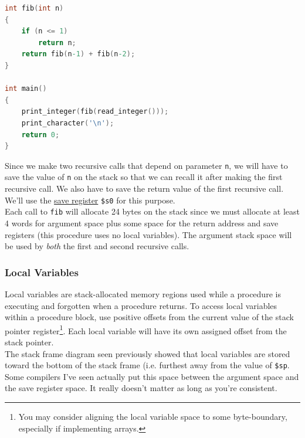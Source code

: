 \documentclass[12pt]{article}
\begin{document}
\begin{lstlisting}[language=C]
int fib(int n)
{
    if (n <= 1)
        return n;
    return fib(n-1) + fib(n-2);
}

int main()
{
    print_integer(fib(read_integer()));
    print_character('\n');
    return 0;
}
\end{lstlisting}

Since we make two recursive calls that depend on parameter \texttt{n}, we will
     have to save the value of \texttt{n} on the stack so that we can recall it
     after making the first recursive call. We also have to save the return
     value of the first recursive call. We'll use the
     \hyperref[sec:saveregs]{save register} \texttt{\$s0} for this purpose.\\

Each call to \texttt{fib} will allocate 24 bytes on the stack since we must
     allocate at least 4 words for argument space plus some space for the return
     address and save registers (this procedure uses no local variables). The
     argument stack space will be used by \textit{both} the first and second
     recursive calls.\\



\newpage
\subsubsection{Local Variables}

Local variables are stack-allocated memory regions used while a procedure is
     executing and forgotten when a procedure returns. To access local variables
     within a procedure block, use positive offsets from the current value of
     the stack pointer register\footnote{You may consider aligning the local
     variable space to some byte-boundary, especially if implementing
     arrays.}. Each local variable will have its own assigned offset from the
     stack pointer.\\

The stack frame diagram seen previously showed that local variables are stored
     toward the bottom of the stack frame (i.e. furthest away from the value of
     \texttt{\$sp}. Some compilers I've seen actually put this space between the
     argument space and the save register space. It really doesn't matter as
     long as you're consistent.\\
\end{document}
